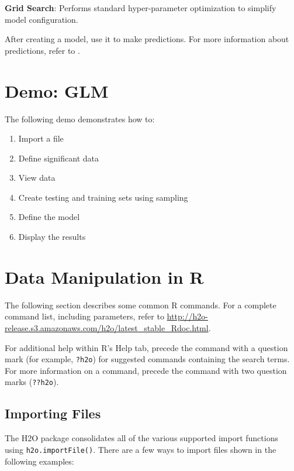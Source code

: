 {{{\textbf{Grid Search}}: Performs standard hyper-parameter optimization to simplify model configuration. 

After creating a model, use it to make predictions. For more information about predictions, refer to {\textbf{}}.


\section{Demo: GLM}

The following demo demonstrates how to:

\begin{enumerate}
\item  Import a file
\item Define significant data
\item View data
\item Create testing and training sets using sampling
\item Define the model
\item Display the results
\end{enumerate}


\waterExampleInR
\medskip



\section{Data Manipulation in R}

The following section describes some common R commands. For a complete command list, including parameters, refer to {\url{http://h2o-release.s3.amazonaws.com/h2o/latest_stable_Rdoc.html}}.

For additional help within R's Help tab, precede the command with a question mark (for example, {\texttt{?h2o}}) for suggested commands containing the search terms. For more information on a command, precede the command with two question marks ({\texttt{??h2o}}). 

\subsection{Importing Files}

The H2O package consolidates all of the various supported import functions using {\texttt{h2o.importFile()}}. %
There are a few ways to import files shown in the following examples:

}}
